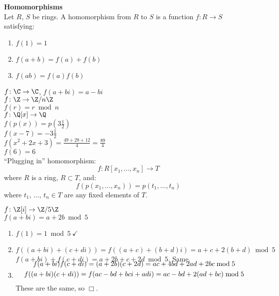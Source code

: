 \textbf{Homomorphisms} \\
 Let $R$, $S$ be rings.  A homomorphism from $R$ to $S$ is a function $f\colon R\to S$ satisfying:
\begin{enumerate}[label=(\arabic*)]
\item $f(1)=1$
\item $f(a+b)=f(a)+f(b)$
\item $f(ab)=f(a)f(b)$
\end{enumerate}
\eg $f\colon\C\to\C$, $f(a+bi)=a-bi$ \\
\eg $f\colon\Z\to\Z/n\Z$ \\ $f(r)=r\bmod n$ \\
\eg $f\colon\Q[x]\to\Q$ \\ $f(p(x))=p(3\frac12)$ \\ $f(x-7)=-3\frac12$ \\
$%
f(x^2+2x+3) = \tfrac{49+28+12}{4} = \tfrac{89}{4}
$ \\ $f(6)=6$ \\
``Plugging in'' homomorphism:
\[ f\colon R[x_1,\dotsc,x_n] \to T \]
where $R$ is a ring, $R\subset T$, and:
\[ f(p(x_1,\dotsc,x_n)) = p(t_1,\dotsc,t_n) \]
where $t_1$, $\dotsc$, $t_n\in T$ are any fixed elements of $T$.

\eg $f\colon\Z[i]\to\Z/5\Z$ \\
$f(a+bi)=a+2b\bmod5$
\begin{enumerate}[label=(\arabic*)]
\item $f(1)=1\bmod5~\checkmark$
\item $f((a+bi)+(c+di))=f((a+c)+(b+d)i)=a+c+2(b+d)\bmod5$ \\
$f(a+bi)+f(c+di)=a+2b+c+2d\bmod5$. Same.
\item \begin{gather*}\\[-2.25\baselineskip]
f(a+bi)f(c+di) = (a+2b)(c+2d) = ac + 4bd + 2ad + 2bc \bmod 5 \\
f((a+bi)(c+di)) = f(ac-bd+bci+adi) = ac - bd + 2(ad+bc) \bmod 5
\end{gather*}
These are the same, so $\Box$.
\end{enumerate}
